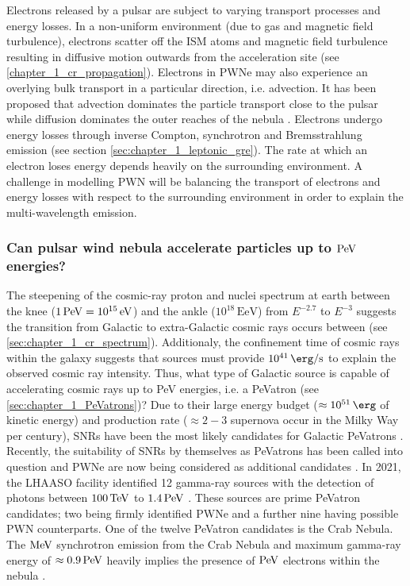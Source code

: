 Electrons released by a pulsar are subject to varying transport processes and energy losses. In a non-uniform environment (due to gas and magnetic field turbulence), electrons scatter off the ISM atoms and magnetic field turbulence resulting in diffusive motion outwards from the acceleration site (see \autoref{chapter_1_cr_propagation}). Electrons in PWNe may also experience an overlying bulk transport in a particular direction, i.e. advection. It has been proposed that advection dominates the particle transport close to the pulsar while diffusion dominates the outer reaches of the nebula \citep{2020A&A...636A.113G, 2021PhRvD.104l3017R}. Electrons undergo energy losses through inverse Compton, synchrotron and Bremsstrahlung emission (see section \autoref{sec:chapter_1_leptonic_gre}). The rate at which an electron loses energy depends heavily on the surrounding environment.
\newpar
A challenge in modelling PWN will be balancing the transport of electrons and energy losses with respect to the surrounding environment in order to explain the multi-wavelength emission.

\subsubsection{Can pulsar wind nebula accelerate particles up to $\PeV$ energies?}

The steepening of the cosmic-ray proton and nuclei spectrum at earth between the knee ($1\,\PeV=10^{15}\,\eV$) and the ankle ($10^{18}\,\si{\exa\electronvolt}$) from $E^{-2.7}$ to $E^{-3}$ suggests the transition from Galactic to extra-Galactic cosmic rays occurs between (see \autoref{sec:chapter_1_cr_spectrum}). Additionaly, the confinement time of cosmic rays within the galaxy suggests that sources must provide $10^{41}\,\ergspersec$ to explain the observed cosmic ray intensity. Thus, what type of Galactic source is capable of accelerating cosmic rays up to PeV energies, i.e. a PeVatron (see \autoref{sec:chapter_1_PeVatrons})?
\newpar
Due to their large energy budget ($\approx 10^{51}\,\ergs$ of kinetic energy) and production rate ($\approx 2-3$ supernova occur in the Milky Way per century), SNRs have been the most likely candidates for Galactic PeVatrons \citep{1983A&A...125..249L, 1984ARA&A..22..425H,2004MNRAS.353..550B,10.1093/mnras/sty1589}. Recently, the suitability of SNRs by themselves as PeVatrons has been called into question \citep{CRISTOFARI2020102492} and PWNe are now being considered as additional candidates \citep{2018MNRAS.478..926O, Xin_2019, de_O_a_Wilhelmi_2022,2022A&A...660A...8B}.
\newpar
In 2021, the LHAASO facility identified 12 gamma-ray sources with the detection of photons between $100\,\TeV$ to $1.4\,\PeV$ \citep{2021Natur.594...33C}. These sources are prime PeVatron candidates; two being firmly identified PWNe and a further nine having possible PWN counterparts. One of the twelve PeVatron candidates is the Crab Nebula. The $\si{\mega\electronvolt}$ synchrotron emission from the Crab Nebula and maximum gamma-ray energy of $\approx 0.9\,\PeV$ heavily implies the presence of $\PeV$ electrons within the nebula \citep{doi:10.1126/science.abg5137}.

